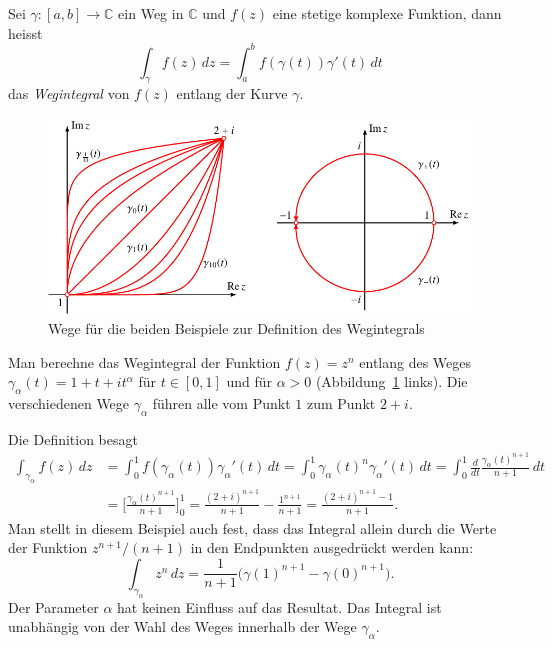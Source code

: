 \begin{definition}
Sei $\gamma\colon[a,b]\to\mathbb C$ ein Weg in $\mathbb C$ und $f(z)$
eine stetige komplexe Funktion, dann heisst
\[
\int_{\gamma} f(z)\,dz = \int_a^bf(\gamma(t)) \gamma'(t)\,dt
\]
das {\em Wegintegral} von $f(z)$ entlang der Kurve $\gamma$.
%
\end{definition}

\begin{figure}
\centering
\includegraphics{chapters/080-funktionentheorie/images/kurven.pdf}
\caption{Wege für die beiden Beispiele zur Definition des Wegintegrals
\label{buch:komplex:fig:wege}}
\end{figure}

\begin{beispiel}
Man berechne das Wegintegral der Funktion $f(z)=z^n$ entlang des
Weges
$\gamma_\alpha(t)=1+t+it^\alpha$
für $t\in[0,1]$ und für $\alpha>0$
(Abbildung~\ref{buch:komplex:fig:wege} links).
Die verschiedenen Wege $\gamma_\alpha$ führen alle vom Punkt $1$ 
zum Punkt $2+i$.

Die Definition besagt
\begin{align*}
\int_{\gamma_\alpha} f(z)\,dz
&=
\int_0^1 f(\gamma_\alpha(t))\gamma_\alpha'(t)\,dt
=
\int_0^1 \gamma_\alpha(t)^n \gamma_\alpha'(t)\,dt
=
\int_0^1 \frac{d}{dt}\frac{\gamma_\alpha(t)^{n+1}}{n+1}\,dt
\\
&=
\biggl[\frac{\gamma_\alpha(t)^{n+1}}{n+1}\biggr]_0^1
=
\frac{(2+i)^{n+1}}{n+1}-\frac{1^{n+1}}{n+1}
=
\frac{(2+i)^{n+1}-1}{n+1}.
\end{align*}
Man stellt in diesem Beispiel auch fest, dass das Integral allein
durch die Werte der Funktion $z^{n+1}/(n+1)$ in den Endpunkten
ausgedrückt werden kann:
\[
\int_{\gamma_\alpha} z^n \,dz
=
\frac1{n+1}\bigl(\gamma(1)^{n+1}-\gamma(0)^{n+1}\bigr).
\]
Der Parameter $\alpha$ hat keinen Einfluss auf das Resultat.
Das Integral ist unabhängig von der Wahl des Weges innerhalb der
Wege $\gamma_\alpha$.
\end{beispiel}

